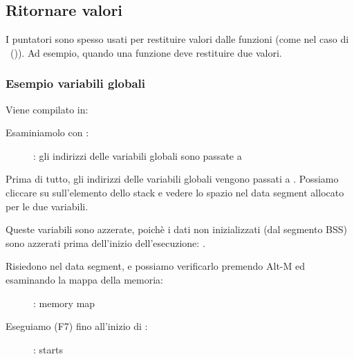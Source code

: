 \subsection{Ritornare valori}

I puntatori sono spesso usati per restituire valori dalle funzioni (come nel caso di \scanf ~()).
Ad esempio, quando una funzione deve restituire due valori.

\subsubsection{Esempio variabili globali}



Viene compilato in:



\myindex{\olly}
\clearpage
Esaminiamolo con \olly:

\begin{figure}[H]
\centering
{}
\caption{\olly:
gli indirizzi delle variabili globali sono passate a \ttfone}
\label{fig:pointers_olly_global_1}
\end{figure}

Prima di tutto, gli indirizzi delle variabili globali vengono passati a \ttfone.
Possiamo cliccare su  sull'elemento dello stack e vedere lo spazio nel data segment allocato per le due variabili.

\clearpage
Queste variabili sono azzerate, poichè i dati non inizializzati (dal segmento \ac{BSS}) sono azzerati prima dell'inizio dell'esecuzione: .

Risiedono nel data segment, e possiamo verificarlo premendo Alt-M ed esaminando la mappa della memoria:

\begin{figure}[H]
\centering
{}
\caption{\olly: memory map}
\label{fig:pointers_olly_global_5}
\end{figure}

\clearpage
Eseguiamo (F7) fino all'inizio di \ttfone: 

\begin{figure}[H]
\centering
{}
\caption{\olly: \ttfone starts}
\label{fig:pointers_olly_global_2}
\end{figure}


